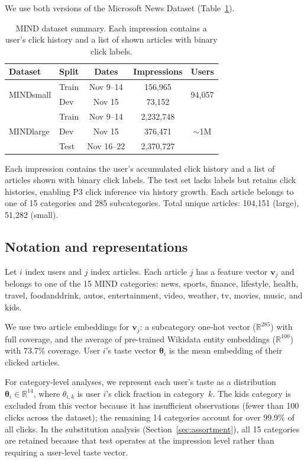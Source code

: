 \documentclass[11pt]{article}
\begin{document}
We use both versions of the Microsoft News Dataset (Table~\ref{tab:datasets}).

\begin{table}[ht]
\centering
\caption{MIND dataset summary. Each impression contains a user's click history and a list of shown articles with binary click labels.}
\label{tab:datasets}
\begin{tabular}{llccc}
\toprule
Dataset & Split & Dates & Impressions & Users \\
\midrule
\multirow{2}{*}{MINDsmall} & Train & Nov 9--14 & 156,965 & \multirow{2}{*}{94,057} \\
 & Dev & Nov 15 & 73,152 & \\
\midrule
\multirow{3}{*}{MINDlarge} & Train & Nov 9--14 & 2,232,748 & \multirow{3}{*}{${\sim}$1M} \\
 & Dev & Nov 15 & 376,471 & \\
 & Test & Nov 16--22 & 2,370,727 & \\
\bottomrule
\end{tabular}
\end{table}
\FloatBarrier

Each impression contains the user's accumulated click history and a list of articles shown with binary click labels. The test set lacks labels but retains click histories, enabling P3 click inference via history growth. Each article belongs to one of 15 categories and 285 subcategories. Total unique articles: 104,151 (large), 51,282 (small).

\subsection{Notation and representations}
\label{sec:notation}

Let $i$ index users and $j$ index articles. Each article $j$ has a feature vector $\mathbf{v}_j$ and belongs to one of the 15 MIND categories: news, sports, finance, lifestyle, health, travel, foodanddrink, autos, entertainment, video, weather, tv, movies, music, and kids.

We use two article embeddings for $\mathbf{v}_j$: a subcategory one-hot vector ($\mathbb{R}^{285}$) with full coverage, and the average of pre-trained Wikidata entity embeddings ($\mathbb{R}^{100}$) with 73.7\% coverage. User $i$'s taste vector $\boldsymbol{\theta}_i$ is the mean embedding of their clicked articles.

For category-level analyses, we represent each user's taste as a distribution $\boldsymbol{\theta}_i \in \mathbb{R}^{14}$, where $\theta_{i,k}$ is user $i$'s click fraction in category~$k$. The kids category is excluded from this vector because it has insufficient observations (fewer than 100 clicks across the dataset); the remaining 14 categories account for over 99.9\% of all clicks. In the substitution analysis (Section~\ref{sec:assortment}), all 15 categories are retained because that test operates at the impression level rather than requiring a user-level taste vector.
\end{document}
